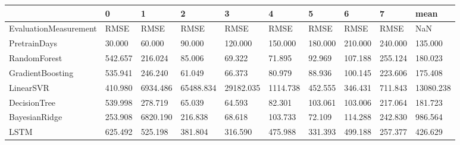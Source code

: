 \begin{tabular}{llllllllll}
\toprule
{} &       0 &        1 &         2 &         3 &        4 &       5 &       6 &       7 &      mean \\
\midrule
EvaluationMeasurement &    RMSE &     RMSE &      RMSE &      RMSE &     RMSE &    RMSE &    RMSE &    RMSE &       NaN \\
PretrainDays          &  30.000 &   60.000 &    90.000 &   120.000 &  150.000 & 180.000 & 210.000 & 240.000 &   135.000 \\
RandomForest          & 542.657 &  216.024 &    85.006 &    69.322 &   71.895 &  92.969 & 107.188 & 255.124 &   180.023 \\
GradientBoosting      & 535.941 &  246.240 &    61.049 &    66.373 &   80.979 &  88.936 & 100.145 & 223.606 &   175.408 \\
LinearSVR             & 410.980 & 6934.486 & 65488.834 & 29182.035 & 1114.738 & 452.555 & 346.431 & 711.843 & 13080.238 \\
DecisionTree          & 539.998 &  278.719 &    65.039 &    64.593 &   82.301 & 103.061 & 103.006 & 217.064 &   181.723 \\
BayesianRidge         & 253.908 & 6820.190 &   216.838 &    68.618 &  103.733 &  72.109 & 114.288 & 242.830 &   986.564 \\
LSTM                  & 625.492 &  525.198 &   381.804 &   316.590 &  475.988 & 331.393 & 499.188 & 257.377 &   426.629 \\
\bottomrule
\end{tabular}
